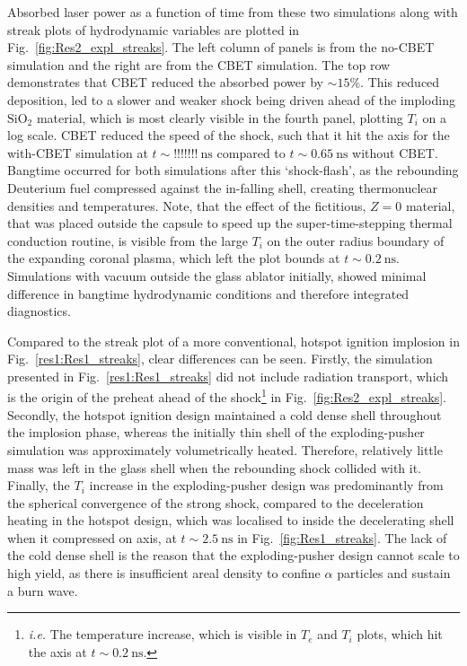 Absorbed laser power as a function of time from these two simulations along with streak plots of hydrodynamic variables are plotted in Fig.~\ref{fig:Res2_expl_streaks}.
The left column of panels is from the no-\ac{CBET} simulation and the right are from the \ac{CBET} simulation.
The top row demonstrates that \ac{CBET} reduced the absorbed power by $\sim15\%$.
This reduced deposition, led to a slower and weaker shock being driven ahead of the imploding $\text{SiO}_2$ material, which is most clearly visible in the fourth panel, plotting $T_i$ on a log scale.
\ac{CBET} reduced the speed of the shock, such that it hit the axis for the with-\ac{CBET} simulation at $t\sim!!!!!!!\ \text{ns}$ compared to $t\sim0.65\ \text{ns}$ without \ac{CBET}.
Bangtime occurred for both simulations after this `shock-flash', as the rebounding Deuterium fuel compressed against the in-falling shell, creating thermonuclear densities and temperatures.
Note, that the effect of the fictitious, $Z=0$ material, that was placed outside the capsule to speed up the super-time-stepping thermal conduction routine, is visible from the large $T_i$ on the outer radius boundary of the expanding coronal plasma, which left the plot bounds at $t\sim0.2\ \text{ns}$.
Simulations with vacuum outside the glass ablator initially, showed minimal difference in bangtime hydrodynamic conditions and therefore integrated diagnostics.

Compared to the streak plot of a more conventional, hotspot ignition implosion in Fig.~\ref{res1:Res1_streaks}, clear differences can be seen.
Firstly, the simulation presented in Fig.~\ref{res1:Res1_streaks} did not include radiation transport, which is the origin of the preheat ahead of the shock\footnote{\textit{i.e.} The temperature increase, which is visible in $T_e$ and $T_i$ plots, which hit the axis at $t\sim0.2\ \text{ns}$.} in Fig.~\ref{fig:Res2_expl_streaks}.
Secondly, the hotspot ignition design maintained a cold dense shell throughout the implosion phase, whereas the initially thin shell of the exploding-pusher simulation was approximately volumetrically heated.
Therefore, relatively little mass was left in the glass shell when the rebounding shock collided with it.
Finally, the $T_i$ increase in the exploding-pusher design was predominantly from the spherical convergence of the strong shock, compared to the deceleration heating in the hotspot design, which was localised to inside the decelerating shell when it compressed on axis, at $t\sim2.5\ \text{ns}$ in Fig.~\ref{fig:Res1_streaks}.
The lack of the cold dense shell is the reason that the exploding-pusher design cannot scale to high yield, as there is insufficient areal density to confine $\alpha$ particles and sustain a burn wave.

